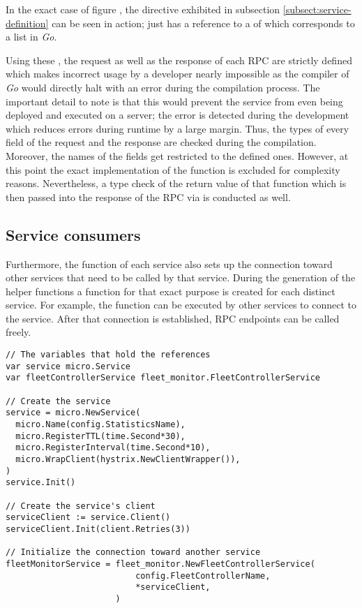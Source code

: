 \documentclass[12pt,a4paper,twoside]{report}
\begin{document}
In the exact case of figure ,
the  directive exhibited in subsection
\ref{subsect:service-definition} can be seen in action;
 just has a reference to a  of
 which corresponds to a list in \textit{Go}.

Using these , the request as well as the response of each RPC
are strictly defined which makes incorrect usage by a developer nearly impossible
as the compiler of \textit{Go} would directly halt with an error during the
compilation process.
The important detail to note is that this would prevent the service from
even being deployed and executed on a server; the error is detected during
the development which reduces errors during runtime by a large margin.
Thus, the types of every field of the request and the response are checked
during the compilation. Moreover, the names of the fields get restricted
to the defined ones.
However, at this point the exact implementation of the function
 is excluded for complexity reasons.
Nevertheless, a type check of the return value of that function which is then
passed into the response of the RPC via  is conducted as well.

\subsection{Service consumers}

Furthermore, the  function of each service also sets up
the connection toward other services that need to be called by that service.
During the generation of the helper functions a function for that exact purpose
is created for each distinct service.
For example, the function  can be executed by
other services to connect to the  service. After that
connection is established, RPC endpoints can be called freely.

\begin{lstlisting}[title=services/statistics/main.go, float, floatplacement=H]
// The variables that hold the references
var service micro.Service
var fleetControllerService fleet_monitor.FleetControllerService

// Create the service
service = micro.NewService(
  micro.Name(config.StatisticsName),
  micro.RegisterTTL(time.Second*30),
  micro.RegisterInterval(time.Second*10),
  micro.WrapClient(hystrix.NewClientWrapper()),
)
service.Init()

// Create the service's client
serviceClient := service.Client()
serviceClient.Init(client.Retries(3))

// Initialize the connection toward another service
fleetMonitorService = fleet_monitor.NewFleetControllerService(
                          config.FleetControllerName,
                          *serviceClient,
                      )
\end{lstlisting}
\end{document}
